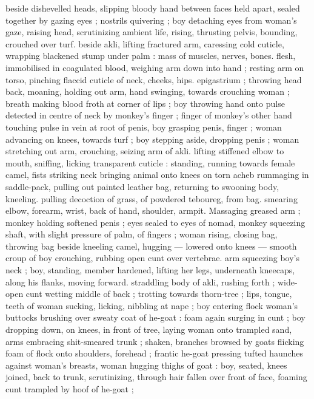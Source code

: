 beside dishevelled heads, slipping bloody hand between faces held 
apart, sealed together by gazing eyes ; nostrils quivering ; boy 
detaching eyes from woman's gaze, raising head, scrutinizing 
ambient life, rising, thrusting pelvis, bounding, crouched over turf. 
beside akli, lifting fractured arm, caressing cold cuticle, wrapping 
blackened stump under palm : mass of muscles, nerves, bones. 
flesh, immobilised in coagulated blood, weighing arm down into hand 
; resting arm on torso, pinching flaccid cuticle of neck, cheeks, hips. 
epigastrium ; throwing head back, moaning, holding out arm, hand 
swinging, towards crouching woman ; breath making blood froth at 
corner of lips ; boy throwing hand onto pulse detected in centre of 
neck by monkey's finger ; finger of monkey's other hand touching 
pulse in vein at root of penis, boy grasping penis, finger ; woman 
advancing on knees, towards turf ; boy stepping aside, dropping 
penis ; woman stretching out arm, crouching, seizing arm of akli. 
lifting stiffened elbow to mouth, sniffing, licking transparent cuticle : 
standing, running towards female camel, fists striking neck bringing 
animal onto knees on torn acheb rummaging in saddle-pack, pulling 
out painted leather bag, returning to swooning body, kneeling. 
pulling decoction of grass, of powdered teboureg, from bag. 
smearing elbow, forearm, wrist, back of hand, shoulder, armpit. 
Massaging greased arm ; monkey holding softened penis ; eyes 
sealed to eyes of nomad, monkey squeezing shaft, with slight 
pressure of palm, of fingers ; woman rising, closing bag, throwing 
bag beside kneeling camel, hugging --- lowered onto knees --- 
smooth croup of boy crouching, rubbing open cunt over vertebrae. 
arm squeezing boy's neck ; boy, standing, member hardened, lifting 
her legs, underneath kneecaps, along his flanks, moving forward. 
straddling body of akli, rushing forth ; wide-open cunt wetting 
middle of back ; trotting towards thorn-tree ; lips, tongue, teeth of 
woman sucking, licking, nibbling at nape ; boy entering flock {\gl} 
woman's buttocks brushing over sweaty coat of he-goat : foam again 
surging in cunt ; boy dropping down, on knees, in front of tree, 
laying woman onto trampled sand, arms embracing shit-smeared 
trunk ; shaken, branches browsed by goats flicking foam of flock 
onto shoulders, forehead ; frantic he-goat pressing tufted haunches 
against woman's breasts, woman hugging thighs of goat : boy, 
seated, knees joined, back to trunk, scrutinizing, through hair fallen 
over front of face, foaming cunt trampled by hoof of he-goat ; 
